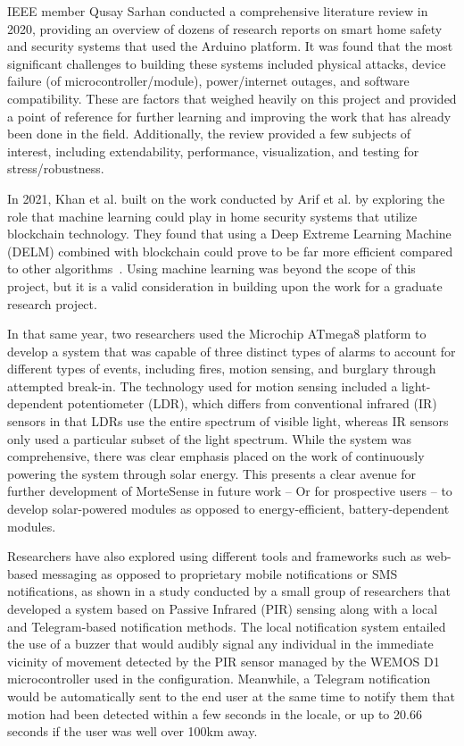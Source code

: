 IEEE member Qusay Sarhan conducted a comprehensive literature review in 2020, providing an
overview of dozens of research reports on smart home safety and security systems that
used the Arduino platform. It was found that the most significant challenges to building
these systems included physical attacks, device failure (of microcontroller/module),
power/internet outages, and software compatibility. These are factors that
weighed heavily on this project and provided a point of reference for further learning
and improving the work that has already been done in the field.
Additionally, the review provided a few subjects of interest, including extendability,
performance, visualization, and testing for stress/robustness. \cite{sarhan2020}

In 2021, Khan et al. built on the work conducted by Arif et al. by exploring the role that
machine learning could play in home security systems that utilize blockchain technology. They
found that using a Deep Extreme Learning Machine (DELM) combined with blockchain could prove
to be far more efficient compared to other algorithms~\cite{khanEtAl2021}. Using machine
learning was beyond the scope of this project, but it is a valid consideration in building
upon the work for a graduate research project.

In that same year, two researchers used the Microchip ATmega8 platform to develop a system
that was capable of three distinct types of alarms to account for different types of events,
including fires, motion sensing, and burglary through attempted break-in. The technology used
for motion sensing included a light-dependent potentiometer (LDR), which differs from
conventional infrared (IR) sensors in that LDRs use the entire spectrum of visible light,
whereas IR sensors only used a particular subset of the light spectrum. While the system was
comprehensive, there was clear emphasis placed on the work of continuously powering the
system through solar energy.\cite{chowdhuryAhmed2021} This presents a clear avenue for
further development of MorteSense in future work -- Or for prospective users -- to develop
solar-powered modules as opposed to energy-efficient, battery-dependent modules.

Researchers have also explored using different tools and frameworks such as web-based
messaging as opposed to proprietary mobile notifications or SMS notifications, as shown in a
study conducted by a small group of researchers that developed a system based on Passive
Infrared (PIR) sensing along with a local and Telegram-based notification methods. The local
notification system entailed the use of a buzzer that would audibly signal any individual in
the immediate vicinity of movement detected by the PIR sensor managed by the WEMOS D1
microcontroller used in the configuration. Meanwhile, a Telegram notification would be
automatically sent to the end user at the same time to notify them that motion had been
detected within a few seconds in the locale, or up to 20.66 seconds if the user was well over
100km away. \cite{WahyuniEtAl2021}

